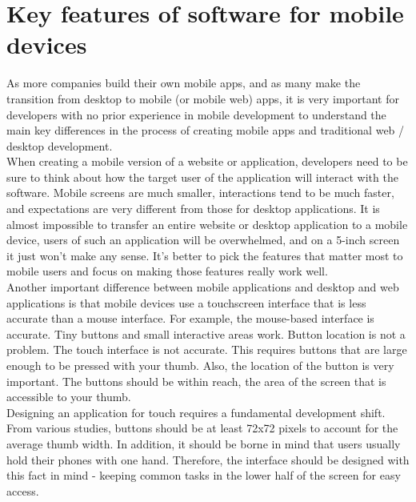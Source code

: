 \documentclass[10pt,slovak,a4paper]{article}
\begin{document}
\section{Key features of software for mobile devices}
As more companies build their own mobile apps, and as many make the transition from desktop to mobile (or mobile web) apps, it is very important for developers with no prior experience in mobile development to understand the main key differences in the process of creating mobile apps and traditional web / desktop development.
\\
When creating a mobile version of a website or application,  developers need to be sure to think about how the target user of the application will interact with the software. Mobile screens are much smaller, interactions tend to be much faster, and expectations are very different from those for desktop applications. It is almost impossible to transfer an entire website or desktop application to a mobile device, users of such an application will be overwhelmed, and on a 5-inch screen it just won't make any sense. It's better to pick the features that matter most to mobile users and focus on making those features really work well.
\\
Another important difference between mobile applications and desktop and web applications is that mobile devices use a touchscreen interface that is less accurate than a mouse interface.
For example, the mouse-based interface is accurate. Tiny buttons and small interactive areas work. Button location is not a problem.
The touch interface is not accurate. This requires buttons that are large enough to be pressed with your thumb. Also, the location of the button is very important.  The buttons should be within reach, the area of the screen that is accessible to your thumb.
\\
Designing an application for touch requires a fundamental development shift. From various studies, buttons should be at least 72x72 pixels to account for the average thumb width. In addition, it should be borne in mind that users usually hold their phones with one hand. Therefore, the interface should be designed with this fact in mind - keeping common tasks in the lower half of the screen for easy access\cite{moazed2019platform}.
\end{document}
